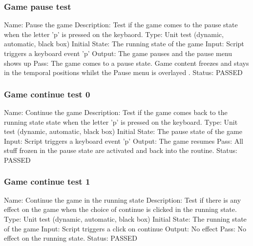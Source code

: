 \documentclass{article}
\begin{document}
\subsubsection{Game pause test}
\label{sec:3.1.8}
Name:  Pause the game\newline
Description: Test if the game comes to the pause state when the letter 'p' is 
pressed on the keybaord. \newline
Type: Unit test (dynamic, automatic, black box) \newline
Initial State: The running state of the game \newline
Input: Script triggers a keyboard event 'p'\newline
Output: The game pauses and the pause menu shows up \newline
Pass: The game comes to a pause state. Game content freezes and 
stays in the temporal positions whilst the Pause menu is overlayed . \newline
\newline Status: PASSED

\subsubsection{Game continue test 0}
\label{sec:3.1.9}
Name:  Continue the game\newline
Description: Test if the game comes back to the running state state when the letter 'p' is 
pressed on the keyboard. \newline
Type: Unit test (dynamic, automatic, black box) \newline
Initial State: The pause state of the game\newline
Input: Script triggers a keyboard event 'p'\newline
Output: The game resumes \newline
Pass: All stuff frozen in the pause state are activated and back into the 
routine. \newline
\newline Status: PASSED

\subsubsection{Game continue test 1}
\label{sec:3.1.10}
Name:  Continue the game in the running state\newline
Description: Test if there is any effect on the game when the choice of 
continue is clicked in the running state. \newline
Type: Unit test (dynamic, automatic, black box) \newline
Initial State: The running state of the game \newline
Input: Script triggers a click on continue\newline
Output: No effect \newline
Pass: No effect on the running state. \newline
\newline Status: PASSED
\end{document}
